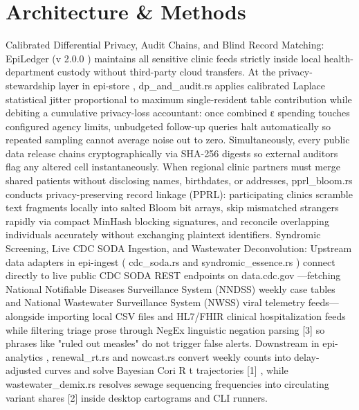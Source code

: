 \documentclass[10pt,letterpaper]{article}
\begin{document}
\section{Architecture \& Methods}
Calibrated Differential Privacy, Audit Chains, and Blind Record Matching: EpiLedger (v 2.0.0 ) maintains all sensitive clinic feeds strictly inside local health-department custody without third-party cloud transfers. At the privacy-stewardship layer in epi-store , dp\_and\_audit.rs applies calibrated Laplace statistical jitter proportional to maximum single-resident table contribution while debiting a cumulative privacy-loss accountant: once combined ε spending touches configured agency limits, unbudgeted follow-up queries halt automatically so repeated sampling cannot average noise out to zero. Simultaneously, every public data release chains cryptographically via SHA-256 digests so external auditors flag any altered cell instantaneously. When regional clinic partners must merge shared patients without disclosing names, birthdates, or addresses, pprl\_bloom.rs conducts privacy-preserving record linkage (PPRL): participating clinics scramble text fragments locally into salted Bloom bit arrays, skip mismatched strangers rapidly via compact MinHash blocking signatures, and reconcile overlapping individuals accurately without exchanging plaintext identifiers. Syndromic Screening, Live CDC SODA Ingestion, and Wastewater Deconvolution: Upstream data adapters in epi-ingest ( cdc\_soda.rs and syndromic\_essence.rs ) connect directly to live public CDC SODA REST endpoints on data.cdc.gov ---fetching National Notifiable Diseases Surveillance System (NNDSS) weekly case tables and National Wastewater Surveillance System (NWSS) viral telemetry feeds---alongside importing local CSV files and HL7/FHIR clinical hospitalization feeds while filtering triage prose through NegEx linguistic negation parsing [3] so phrases like "ruled out measles" do not trigger false alerts. Downstream in epi-analytics , renewal\_rt.rs and nowcast.rs convert weekly counts into delay-adjusted curves and solve Bayesian Cori R t trajectories [1] , while wastewater\_demix.rs resolves sewage sequencing frequencies into circulating variant shares [2] inside desktop cartograms and CLI runners.
\end{document}
